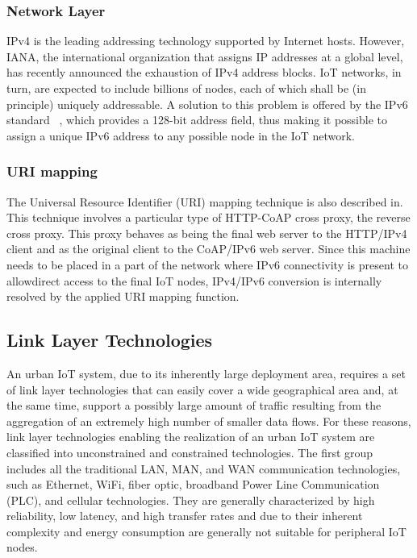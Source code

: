 \documentclass[conference]{IEEEtran}
\begin{document}
	
	\subsubsection{Network Layer}  IPv4 is the leading addressing technology supported by Internet hosts. However, IANA, the international organization that assigns IP addresses at a global level, has recently announced the exhaustion of IPv4 address blocks. IoT networks, in turn, are expected to include billions of nodes, each of which shall be (in principle) uniquely addressable. A solution to this problem is offered by the IPv6 standard ~\autocite{r6}, which provides a 128-bit address field, thus making it possible to assign a unique IPv6 address to any possible node in the IoT network.
	
	\subsubsection{URI mapping}  The Universal Resource Identifier (URI) mapping technique is also described in. This technique involves a particular type of HTTP-CoAP cross proxy, the reverse cross proxy. This proxy behaves as being the final web server to the HTTP/IPv4 client and as the original client to the CoAP/IPv6 web server. Since this machine needs to be placed in a part of the
	network where IPv6 connectivity is present to allowdirect access to the final IoT nodes, IPv4/IPv6 conversion is internally resolved by the applied URI mapping function.
	
	\subsection{Link Layer Technologies}An urban IoT system, due to its inherently large deployment area, requires a set of link layer technologies that can easily cover a wide geographical area and, at the same time, support a possibly
	large amount of traffic resulting from the aggregation of an extremely high number of smaller data flows. For these reasons, link layer technologies enabling the realization of an urban IoT system are classified into unconstrained and constrained technologies. The first group includes all the traditional LAN, MAN, and WAN communication technologies, such as Ethernet, WiFi,
	fiber optic, broadband Power Line Communication (PLC), and cellular technologies. They are generally characterized by high reliability, low latency, and high transfer rates and due to their inherent complexity and energy consumption are generally not suitable for peripheral IoT nodes.
	
\end{document}
